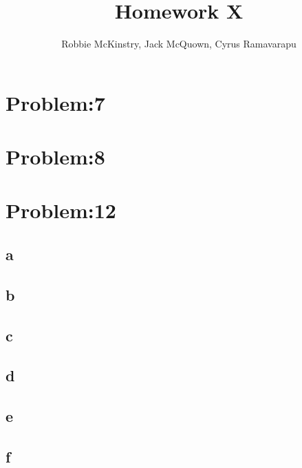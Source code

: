 \documentclass[12pt]{article}
\begin{document}
\title{Homework X}
\author{Robbie McKinstry, Jack McQuown, Cyrus Ramavarapu}
\renewcommand{\today}{7 October 2016}
\renewcommand{\baselinestretch}{1.5}
\maketitle

\section*{Problem:7}
\section*{Problem:8}
\section*{Problem:12}
\subsection*{a}
\subsection*{b}
\subsection*{c}
\subsection*{d}
\subsection*{e}
\subsection*{f}
\end{document}

